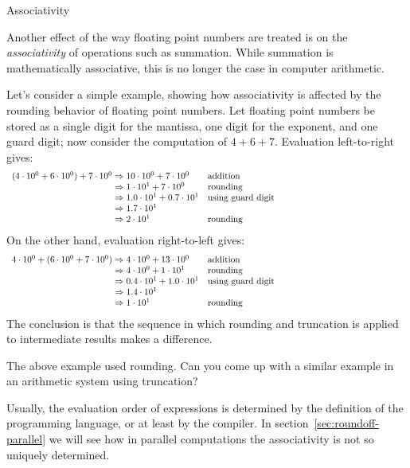  {Associativity}
\label{sec:fp-associative}

Another effect of the way floating point numbers are treated
is on the
\emph{associativity}
of operations such as summation.
While summation is mathematically associative, this is no longer
the case in computer arithmetic.

Let's consider a simple example, showing how associativity is affected
by the rounding behavior of floating point numbers.
Let floating point numbers be stored as a single digit for the mantissa,
one digit for the exponent, and one guard digit;
now consider the computation of $4+6+7$.
Evaluation left-to-right gives:
\begin{equation}
\begin{array}{l@{{}\Rightarrow{}}lp{3in}}
(4\cdot10^0 + 6\cdot10^0)+7\cdot10^0&10\cdot10^0+7\cdot10^0&addition\\
&1\cdot 10^1 + 7\cdot10^0&rounding\\
&1.0\cdot 10^1 + 0.7\cdot10^1&using guard digit\\
&1.7\cdot 10^1\\
&2\cdot10^1&rounding
\end{array}
\end{equation}
On the other hand, evaluation right-to-left gives:
\begin{equation}
\begin{array}{l@{{}\Rightarrow{}}lp{3in}}
4\cdot10^0 + (6\cdot10^0 + 7\cdot10^0)&4\cdot 10^0 + 13\cdot10^0&addition\\
&4\cdot 10^0 + 1\cdot10^1&rounding\\
&0.4\cdot 10^1 + 1.0\cdot10^1&using guard digit\\
&1.4\cdot 10^1\\
&1\cdot10^1&rounding
\end{array}
\end{equation}
The conclusion is that the sequence in which rounding and truncation is applied to
intermediate results makes a difference.

\begin{exercise}
  The above example used rounding. Can you come up with a similar example
  in an arithmetic system using truncation?
\end{exercise}

Usually, the evaluation order of expressions is determined by the definition of the
programming language, or at least by the compiler.
In section~\ref{sec:roundoff-parallel} we will see how in parallel computations the associativity
is not so uniquely determined.

